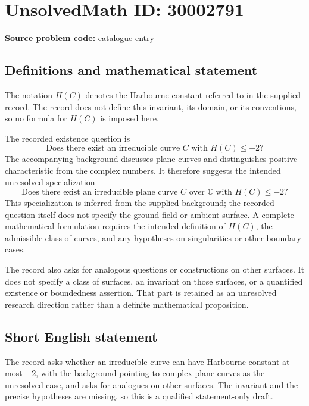 \documentclass[11pt]{article}
\newcommand{\C}{\mathbb{C}}
\begin{document}
\section*{UnsolvedMath ID: 30002791}
\textbf{Source problem code:} catalogue entry
\subsection{Definitions and mathematical statement}
The notation \(H(C)\) denotes the Harbourne constant referred to in the supplied record. The record does not define this invariant, its domain, or its conventions, so no formula for \(H(C)\) is imposed here.

The recorded existence question is
\[
\text{Does there exist an irreducible curve }C\text{ with }H(C)\leq -2?
\]
The accompanying background discusses plane curves and distinguishes positive characteristic from the complex numbers. It therefore suggests the intended unresolved specialization
\[
\text{Does there exist an irreducible plane curve }C\text{ over }\C
\text{ with }H(C)\leq -2?
\]
This specialization is inferred from the supplied background; the recorded question itself does not specify the ground field or ambient surface. A complete mathematical formulation requires the intended definition of \(H(C)\), the admissible class of curves, and any hypotheses on singularities or other boundary cases.

The record also asks for analogous questions or constructions on other surfaces. It does not specify a class of surfaces, an invariant on those surfaces, or a quantified existence or boundedness assertion. That part is retained as an unresolved research direction rather than a definite mathematical proposition.
\subsection{Short English statement}
The record asks whether an irreducible curve can have Harbourne constant at most \(-2\), with the background pointing to complex plane curves as the unresolved case, and asks for analogues on other surfaces. The invariant and the precise hypotheses are missing, so this is a qualified statement-only draft.
\end{document}
